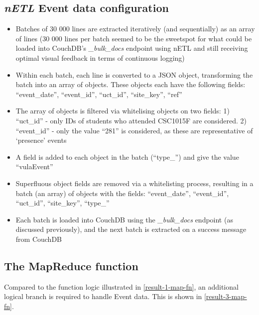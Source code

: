 \subsection*{\textit{nETL} Event data configuration}
\begin{itemize}
    \item Batches of 30 000 lines are extracted iteratively (and sequentially) as an array of lines (30 000 lines per batch seemed to be the sweetspot for what could be loaded into CouchDB's \textit{\_bulk\_docs} endpoint using nETL and still receiving optimal visual feedback in terms of continuous logging)
    \item Within each batch, each line is converted to a JSON object, transforming the batch into an array of objects. These objects each have the following fields: ``event\_date'', ``event\_id'', ``uct\_id'',  ``site\_key'', ``ref''
    \item The array of objects is filtered via whitelising objects on two fields: 1) ``uct\_id'' - only IDs of students who attended CSC1015F are considered. 2) ``event\_id'' - only the value ``281'' is considered, as these are representative of `presence' events
    \item A field is added to each object in the batch (``type\_'') and give the value ``vulaEvent''
    \item Superfluous object fields are removed via a whitelisting process, resulting in a batch (an array) of objects with the fields: ``event\_date'', ``event\_id'', ``uct\_id'', ``site\_key'', ``type\_''
    \item Each batch is loaded into CouchDB using the \textit{\_bulk\_docs} endpoint (as discussed previously), and the next batch is extracted on a success message from CouchDB
\end{itemize}

\subsection*{The MapReduce function}
Compared to the function logic illustrated in \ref{result-1-map-fn}, an additional logical branch is required to handle Event data. This is shown in \ref{result-3-map-fn}.

